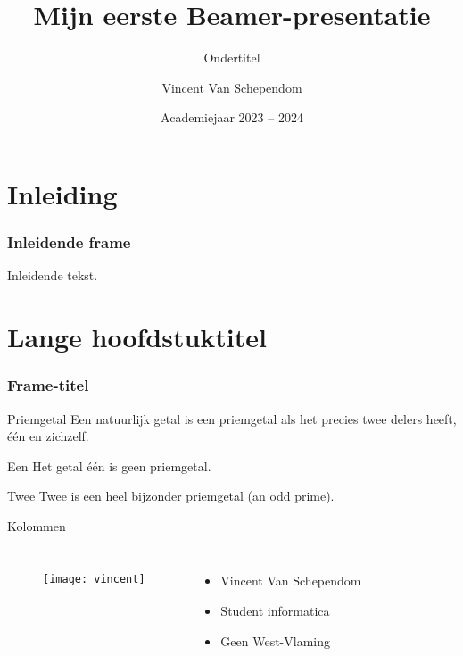 \documentclass
[kulak] %
{kulakbeamer}
\title[MEBP]{Mijn eerste Beamer-presentatie}
\subtitle{Ondertitel}
\author[VVS]{Vincent Van Schependom}
\institute[Kulak]{KU Leuven Kulak}
\date{Academiejaar 2023 -- 2024}
\begin{document}
	
	\begin{titleframe}
		\titlepage
	\end{titleframe}
	
	\begin{outlineframe}[Overzicht]
		\tableofcontents
	\end{outlineframe}
	
	
	\section{Inleiding}
	
	\begin{frame}
		\frametitle{Inleidende frame}
		Inleidende tekst.
	\end{frame}
	
	\section[Korte titel]{Lange hoofdstuktitel}
	
	\begin{frame}
		\frametitle{Frame-titel}
		
		\begin{block}{Priemgetal}
			Een natuurlijk getal is een priemgetal als het precies twee delers heeft, één en zichzelf.
		\end{block}
		
		\begin{alertblock}{Een}
			Het getal één is geen priemgetal.
		\end{alertblock}
		
		\begin{exampleblock}{Twee}
			Twee is een heel bijzonder priemgetal (an odd prime).
		\end{exampleblock}
	\end{frame}
	
	\begin{frame}{Kolommen}
	
		\begin{columns}
			\column{.5\textwidth}
			\begin{figure}
				\texttt{[image: vincent]}
			\end{figure}
			\column{.5\textwidth}
			\begin{itemize}
				\item Vincent Van Schependom
				\item Student informatica
				\item Geen West-Vlaming
			\end{itemize}
		\end{columns}
	
	\end{frame}
	
\end{document}
